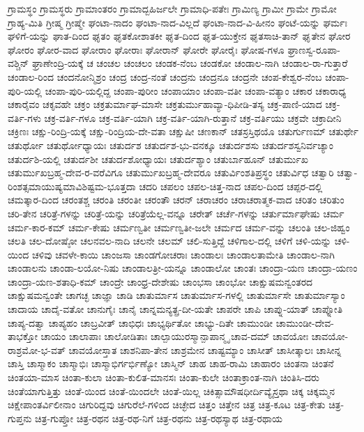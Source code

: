 {ಗ್ರಾಮಸ್ಥಂ
ಗ್ರಾಮಸ್ಥರು
ಗ್ರಾಮಾಂತರಂ
ಗ್ರಾಮಾದ್ಬಹಿರ್ಜಲೇ
ಗ್ರಾಮಾಧಿ-ಪತೇಃ
ಗ್ರಾಮಿಣ್ಯ
ಗ್ರಾಮೀ
ಗ್ರಾಮೇ
ಗ್ರಾಮೋ
ಗ್ರಾಹ್ಯ-ಮಿತಿ
ಗ್ರೀಷ್ಮ
ಗ್ರೀಷ್ಮೇ
ಘಂಟಾ-ನಾದಂ
ಘಂಟಾ-ನಾದ-ವಿಲ್ಲದೆ
ಘಂಟಾ-ನಾದ-ವಿ-ಹೀನಂ
ಘಂಟೆ-ಯನ್ನು
ಘರ್ಮಃ
ಘಳಿಗೆ-ಯನ್ನು
ಘಾತ-ದಿಂದ
ಘೃತಂ
ಘೃತಕೋಶಾತಕೀ
ಘೃತ-ದಿಂದ
ಘೃತ-ಯುಕ್ತೇನ
ಘೃತಸಾಚಿ-ತಾನ್
ಘೃತೇನ
ಘೋರ
ಘೋರಂ
ಘೋರ-ವಾದ
ಘೋರಾಂ
ಘೋರಾಃ
ಘೋರಾನ್
ಘೋರೇ
ಘೋರೈಃ
ಘೋಷ-ಗಳೂ
ಘ್ರಾಣಸ್ವ-ರೂಪಾ-ವಶ್ಚಿನ್
ಘ್ರಾಣೇಂದ್ರಿ-ಯಕ್ಕೆ
ಚ
ಚಂಚಲ
ಚಂಚಲಂ
ಚಂಡಕ-ನೆಂಬ
ಚಂಡಕೋ
ಚಂಡಾಲ-ನಾಗಿ
ಚಂಡಾಲ-ರಾ-ಗುತ್ತಾರೆ
ಚಂಡಾಲ-ರಿಂದ
ಚಂದನೋನ್ಮಿಶ್ರಂ
ಚಂದ್ರ
ಚಂದ್ರ-ನಂತೆ
ಚಂದ್ರನು
ಚಂದ್ರನೂ
ಚಂದ್ರನೇ
ಚಂಪ-ಕೇಶ್ವರ-ನೆಂಬ
ಚಂಪಾ-ಪುರಿ-ಯಲ್ಲಿ
ಚಂಪಾ-ಪುರಿ-ಯಲ್ಲಿದ್ದ
ಚಂಪಾ-ಪುರೀಂ
ಚಂಪಾಯಾಂ
ಚಂಪಾ-ವತೀ
ಚಂಪಾ-ವತ್ಯಾಂ
ಚಕಾರ
ಚಕಾರಾಧ್ಯ
ಚಕಾರೈವಂ
ಚಕೃವಹೇ
ಚಕ್ರಂ
ಚಕ್ರತುರ್ಮಾಘ-ಮಾಸೇ
ಚಕ್ರತುರ್ಮುಹಾವ್ಯಾ-ಧಿಪೀಡಿ-ತಸ್ಯ
ಚಕ್ರ-ಪಾಣಿ-ಯಾದ
ಚಕ್ರ-ವರ್ತಿ-ಗಳು
ಚಕ್ರ-ವರ್ತಿ-ಗಳೂ
ಚಕ್ರ-ವರ್ತಿ-ಯಾಗಿ
ಚಕ್ರ-ವರ್ತಿ-ಯಾಗಿ-ರುತ್ತಾನೆ
ಚಕ್ರ-ವರ್ತಿಯು
ಚಕ್ರವೇ
ಚಕ್ರಾದೀನಿ
ಚಕ್ರಿಣಃ
ಚಕ್ಷು-ರಿಂದ್ರಿ-ಯಕ್ಕೆ
ಚಕ್ಷು-ರಿಂದ್ರಿಯ-ದೇ-ವತಾ
ಚಕ್ಷುಷೀ
ಚಣಕಾನ್
ಚತಸ್ರಸ್ತಿಥಯೊ
ಚತುರ್ಗುಣಮ್
ಚತುರ್ಥೇ
ಚತುರ್ಥೋ
ಚತುರ್ಥೋಧ್ಯಾಯಃ
ಚತುರ್ದಶ
ಚತುರ್ದಶ-ಭು-ವನಕ್ಕೂ
ಚತುರ್ದಶಸು
ಚತುರ್ದಶಸ್ವನಿರ್ವಚ್ಯಾಂ
ಚತುರ್ದಶಿ-ಯಲ್ಲಿ
ಚತುರ್ದಶೀ
ಚತುರ್ದಶೋಧ್ಯಾಯಃ
ಚತುರ್ದಶ್ಯಾಂ
ಚತುರ್ಬಾಹೂನ್
ಚತುರ್ಮುಖ
ಚತುರ್ಮುಖಬ್ರಹ್ಮ-ದೇವ-ರ-ವರೆವಿಗೂ
ಚತುರ್ಮುಖಬ್ರಹ್ಮ-ದೇವರೂ
ಚತುರ್ವಿಂಶತಿಪ್ರಸ್ಥಂ
ಚತುರ್ವಿಧ
ಚತ್ವಾರಿ
ಚತ್ವಾ-ರಿಂಶತ್ಸಮಾಯುಷ್ಯಮಾವಿಶಿಷ್ಟಮ-ಭೂತ್ತದಾ
ಚದರಿ
ಚಪಲಂ
ಚಪಲ-ಚಿತ್ತ-ನಾದ
ಚಪಲ-ದಿಂದ
ಚಪ್ಪರ-ದಲ್ಲಿ
ಚಮತ್ಕಾರ-ದಿಂದ
ಚರಂತಶ್ಚ
ಚರಂತಿ
ಚರಂತೀ
ಚರಂತೌ
ಚರನ್
ಚರಾಚರಂ
ಚರಾಚರಾತ್ಮಕ-ವಾದ
ಚರಿತಂ
ಚರಿತುಂ
ಚರಿ-ತೇನ
ಚರಿತ್ರೆ-ಗಳನ್ನು
ಚರಿತ್ರೆ-ಯನ್ನು
ಚರಿತ್ರೆಯೆಲ್ಲ-ವನ್ನೂ
ಚರೇತ್
ಚರ್ಚೆ-ಗಳನ್ನು
ಚರ್ತುರ್ಮಾಘೇಷು
ಚರ್ಮ
ಚರ್ಮ-ಕಾರ-ಕಮ್
ಚರ್ಮ-ಕೇಷು
ಚರ್ಮಣ್ವತೀ
ಚರ್ಮಣ್ವತೀ-ಜಲೇ
ಚರ್ಮದ
ಚರ್ಮ-ವನ್ನು
ಚಲಂತಿ
ಚಲ-ಜಿಹ್ವಂ
ಚಲತಿ
ಚಲ-ದೋಷ್ಠೋ
ಚಲನವಲ-ನಾದಿ
ಚಲನೇ
ಚಲಮ್
ಚಲಿ-ಸುತ್ತಿದ್ದೆ
ಚಳಿಗಾಲ-ದಲ್ಲಿ
ಚಳಿಗೆ
ಚಳಿ-ಯನ್ನು
ಚಳಿ-ಯಿಂದ
ಚಳಿವು
ಚವಳೇ-ಕಾಯಿ
ಚಾಂಜಸಾ
ಚಾಂಡಗೋಚರಾಃ
ಚಾಂಡಾಲಃ
ಚಾಂಡಾಲತಾಮೇತಿ
ಚಾಂಡಾಲ-ನಾಗಿ
ಚಾಂಡಾಲನು
ಚಾಂಡಾ-ಲಯೋ-ನಿಷು
ಚಾಂಡಾಲತ್ರೀ-ಯನ್ನೂ
ಚಾಂಡಾಲೋ
ಚಾಂತಃ
ಚಾಂದ್ರಾ-ಯಣ
ಚಾಂದ್ರಾ-ಯಣಂ
ಚಾಂದ್ರಾ-ಯಣ-ಶತಾಧಿ-ಕಮ್
ಚಾಂದ್ರೇ
ಚಾಂಧ್ರ-ದೇಶೇಷು
ಚಾಂಭಸಾ
ಚಾಂಭೋ
ಚಾಕ್ಷುಷಮನ್ವಂತರದ
ಚಾಕ್ಷುಷಮನ್ವಂತೇ
ಚಾಗಚ್ಛ
ಚಾಜ್ಞಾ
ಚಾಡಿ
ಚಾತುರ್ಮಾಸ
ಚಾತುರ್ಮಾಸ-ಗಳಲ್ಲಿ
ಚಾತುರ್ಮಾಸೇ
ಚಾತುರ್ಮಾಸ್ಯಾಂ
ಚಾದಾಯ
ಚಾದೈ-ವತೋ
ಚಾನುಗೈಃ
ಚಾನೈ
ಚಾನ್ನಮನ್ಯತ್ಪ್ರ-ದೀ-ಯತೇ
ಚಾಪರೇ
ಚಾಪಿ
ಚಾಪ್ನು-ಯಾತ್
ಚಾಪ್ನೋತಿ
ಚಾಪ್ಯ-ದತ್ವಾ
ಚಾಪ್ಯಹಂ
ಚಾಬ್ರವೀತ್
ಚಾಭಿಧಃ
ಚಾಭ್ಯರ್ಥಿತೋ
ಚಾಭ್ಯು-ದಿತೇ
ಚಾಮುಂಡೀ
ಚಾಮುಂಡೀ-ದೇವ-ತಾಭಕ್ತೋ
ಚಾಯಂ
ಚಾಲಾಪಾಃ
ಚಾಲೋಡಿತಾಃ
ಚಾಲ್ಪಾಯುರಸ್ಮಾನ್ಪಾಪಾನ್ಮೃ
ಚಾವ-ದಮ್
ಚಾವಯೋಃ
ಚಾವಯೋ-ರಾಶ್ರಮೋ-ಭ-ವತ್
ಚಾವಯೋಸ್ತಾತ
ಚಾಶನಿಪಾ-ತೇನ
ಚಾಶ್ರಮೇನ
ಚಾಷ್ಟಮ್ಯಾಂ
ಚಾಸೀತ್
ಚಾಸೀತ್ಕಾಲಃ
ಚಾಸೀನ್ನ
ಚಾಸ್ತಿ
ಚಾಸ್ಮಾಕಂ
ಚಾಸ್ಮಾಭಿಃ
ಚಾಸ್ಮಾಭಿರ್ಗರ್ಭಿಣ್ಯೋ
ಚಾಸ್ಮಿನ್
ಚಾಹ
ಚಾಹ-ರಾಮಿ
ಚಾಹಾರಂ
ಚಿಂತನಾ
ಚಿಂತನೆ
ಚಿಂತಯಾ-ಮಾಸ
ಚಿಂತಾ-ಕುಲಾ
ಚಿಂತಾ-ಕುಲಿತ-ಮಾನಸಃ
ಚಿಂತಾ-ಕುಲೇ
ಚಿಂತಾಕ್ರಾಂತ-ನಾಗಿ
ಚಿಂತಿಸಿ-ದರು
ಚಿಂತೆಯಾಗುತ್ತಿತ್ತು
ಚಿಂತೆ-ಯಿಂದ
ಚಿಂತೆ-ಯಿಂದಲೇ
ಚಿಂತೆ-ಯಿಲ್ಲ
ಚಿಕಿತ್ಸಾಮೌಷಧೀರ್ದಿವ್ಯೈಸ್ತಥಾ
ಚಿಕ್ಕ
ಚಿಕ್ಕಮ್ಮನ
ಚಿಕ್ಷೇಪಾಂತರ್ವಿಲೀನಾಂ
ಚಿಗುರಿದ್ದವು
ಚಿಗುರೆಲೆ-ಗಳಿಂದ
ಚಿಚ್ಛೇದ
ಚಿತ್ತಂ
ಚಿತ್ತೇನ
ಚಿತ್ರ
ಚಿತ್ರ-ಕೂಟ
ಚಿತ್ರ-ಕೇತು
ಚಿತ್ರ-ಗುಪ್ತನು
ಚಿತ್ರ-ಗುಪ್ತೋ
ಚಿತ್ರ-ರಥನ
ಚಿತ್ರ-ರಥ-ನಿಗೆ
ಚಿತ್ರ-ರಥನು
ಚಿತ್ರ-ರಥಸ್ಯಾಥ
ಚಿತ್ರ-ರಥಾಯ
}

